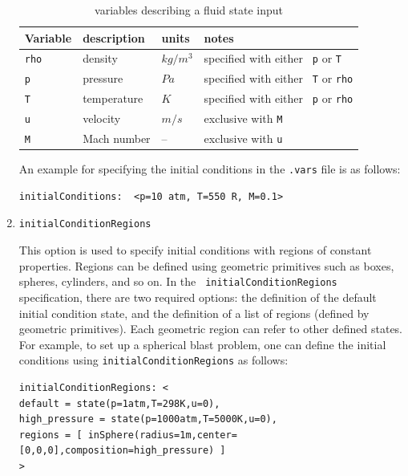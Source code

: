 \documentclass{article}
\begin{document}
\begin{enumerate}
\begin{table}[htbp]

  \begin{centering}
    \leavevmode
  \begin{tabular}{|l|l|l|l|}
    \hline
    Variable & description & units & notes \\
    \hline\hline
    {\tt rho}      & density     & $kg/m^3$ & specified with either {\tt
    p} or {\tt T} \\
    {\tt p}        & pressure    & $Pa$     & specified with either {\tt
    T}  or {\tt rho} \\
    {\tt T}        & temperature & $K$      & specified with either {\tt
    p}  or {\tt rho} \\
    {\tt u}        & velocity    & $m/s$    & exclusive with {\tt M} \\
    {\tt M}        & Mach number &  --    & exclusive with {\tt u} \\
    \hline
  \end{tabular}
\caption{variables describing a fluid state input}
  \label{tab:fs}
  \end{centering}
\end{table}

An example for specifying the initial conditions in the {\tt .vars} file is as follows:

\begin{verbatim}
initialConditions:  <p=10 atm, T=550 R, M=0.1>
\end{verbatim}

\item {\tt initialConditionRegions}

This option is used to specify initial conditions with regions of
constant properties.  Regions can be defined using geometric
primitives such as boxes, spheres, cylinders, and so on. In the {\tt
  initialConditionRegions } specification, there are two required
options: the definition of the default initial condition state, and
the definition of a list of regions (defined by geometric
primitives).  Each geometric region can refer to other defined
states.  For example, to set up a spherical blast problem, one can
define the initial conditions using {\tt initialConditionRegions} as
follows:

\begin{verbatim}
initialConditionRegions: < 
default = state(p=1atm,T=298K,u=0),
high_pressure = state(p=1000atm,T=5000K,u=0),
regions = [ inSphere(radius=1m,center=[0,0,0],composition=high_pressure) ]
>
\end{verbatim}


\end{enumerate}
\end{document}
